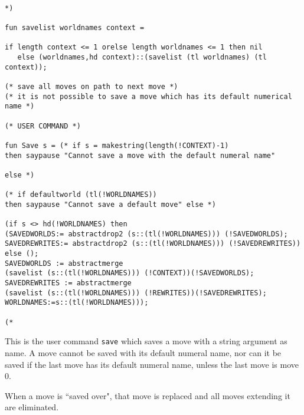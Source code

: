 \documentclass{article}
\begin{document}
\begin{verbatim}

*)

fun savelist worldnames context = 

if length context <= 1 orelse length worldnames <= 1 then nil
   else (worldnames,hd context)::(savelist (tl worldnames) (tl context));

(* save all moves on path to next move *)
(* it is not possible to save a move which has its default numerical name *)

(* USER COMMAND *)

fun Save s = (* if s = makestring(length(!CONTEXT)-1) 
then saypause "Cannot save a move with the default numeral name"

else *)

(* if defaultworld (tl(!WORLDNAMES)) 
then saypause "Cannot save a default move" else *)

(if s <> hd(!WORLDNAMES) then 
(SAVEDWORLDS:= abstractdrop2 (s::(tl(!WORLDNAMES))) (!SAVEDWORLDS);
SAVEDREWRITES:= abstractdrop2 (s::(tl(!WORLDNAMES))) (!SAVEDREWRITES)) else ();
SAVEDWORLDS := abstractmerge
(savelist (s::(tl(!WORLDNAMES))) (!CONTEXT))(!SAVEDWORLDS);
SAVEDREWRITES := abstractmerge 
(savelist (s::(tl(!WORLDNAMES))) (!REWRITES))(!SAVEDREWRITES);
WORLDNAMES:=s::(tl(!WORLDNAMES)));

(*

\end{verbatim}

This is the user command {\tt save} which saves a move with a string argument as name.  A move cannot be saved with its default numeral name, nor can 
it be saved if the last move has its default numeral name, unless the last move is move 0.

When a move is ``saved over", that move is replaced and all moves extending it are eliminated.
\end{document}
